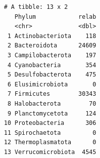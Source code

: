 \documentclass[
  letterpaper,
  DIV=11,
  numbers=noendperiod]{scrartcl}
\newenvironment{Shaded}{\begin{snugshade}}{\end{snugshade}}
\newcommand{\AttributeTok}[1]{\textcolor[rgb]{0.40,0.45,0.13}{#1}}
\newcommand{\CommentTok}[1]{\textcolor[rgb]{0.37,0.37,0.37}{#1}}
\newcommand{\ConstantTok}[1]{\textcolor[rgb]{0.56,0.35,0.01}{#1}}
\newcommand{\FunctionTok}[1]{\textcolor[rgb]{0.28,0.35,0.67}{#1}}
\newcommand{\NormalTok}[1]{\textcolor[rgb]{0.00,0.23,0.31}{#1}}
\newcommand{\OtherTok}[1]{\textcolor[rgb]{0.00,0.23,0.31}{#1}}
\newcommand{\SpecialCharTok}[1]{\textcolor[rgb]{0.37,0.37,0.37}{#1}}
\newcommand{\StringTok}[1]{\textcolor[rgb]{0.13,0.47,0.30}{#1}}
\begin{document}
\begin{verbatim}
# A tibble: 13 x 2
   Phylum            relab
   <chr>             <dbl>
 1 Actinobacteriota    118
 2 Bacteroidota      24609
 3 Campilobacterota    197
 4 Cyanobacteria       354
 5 Desulfobacterota    475
 6 Elusimicrobiota       0
 7 Firmicutes        30343
 8 Halobacterota        70
 9 Planctomycetota     124
10 Proteobacteria      306
11 Spirochaetota         0
12 Thermoplasmatota      0
13 Verrucomicrobiota  4545
\end{verbatim}

\begin{Shaded}
\end{Shaded}
\end{document}
